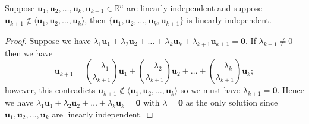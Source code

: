 \begin{proposition}
    Suppose $\bm{u}_1, \bm{u}_2, \ldots, \bm{u}_k, \bm{u}_{k+1} \in \mathbb{R}^n$ are linearly independent and suppose $\bm{u}_{k+1} \not \in \langle \bm{u}_1, \bm{u}_2, \ldots, \bm{u}_k \rangle$, then $\{\bm{u}_1, \bm{u}_2, \ldots, \bm{u}_k, \bm{u}_{k+1}\}$ is linearly independent.
\end{proposition}

\begin{proof}
    Suppose we have $\lambda_1 \bm{u}_1 + \lambda_2 \bm{u}_2 + \ldots + \lambda_k \bm{u}_k + \lambda_{k + 1} \bm{u}_{k + 1} = \bm{0}$. If $\lambda_{k + 1}\neq 0$ then we have 
    \[
        \bm{u}_{k + 1} = 
            \left(
                \frac{-\lambda_1}{\lambda_{k + 1}}
            \right)
            \bm{u}_1
            +
            \left(
                \frac{-\lambda_2}{\lambda_{k + 1}}
            \right)
            \bm{u}_2
            +
            \ldots
            +
            \left(
                \frac{-\lambda_k}{\lambda_{k + 1}}
            \right)
            \bm{u}_k
            ;
    \]
    however, this contradicts $\bm{u}_{k+1} \not \in \langle \bm{u}_1, \bm{u}_2, \ldots, \bm{u}_k \rangle$ so we must have $\lambda_{k + 1} = \bm{0}$. Hence we have $\lambda_1 \bm{u}_1 + \lambda_2 \bm{u}_2 + \ldots + \lambda_k \bm{u}_k = \bm{0}$ with $\lambda = \bm{0}$ as the only solution since $\bm{u}_1, \bm{u}_2, \ldots, \bm{u}_k$ are linearly independent.
\end{proof}
